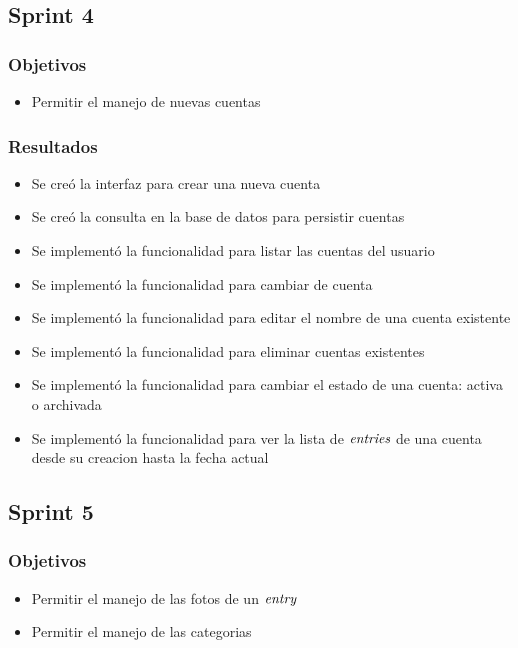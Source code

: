 \subsection{Sprint 4}
\subsubsection{Objetivos}
\begin{itemize}
\item Permitir el manejo de nuevas cuentas
\end{itemize}

\subsubsection{Resultados}
\begin{itemize}

\item Se creó la interfaz para crear una nueva cuenta
\item Se creó la consulta en la base de datos para persistir cuentas
\item Se implementó la funcionalidad para listar las cuentas del usuario 
\item Se implementó la funcionalidad para cambiar de cuenta
\item Se implementó la funcionalidad para editar el nombre de una cuenta existente
\item Se implementó la funcionalidad para eliminar cuentas existentes
\item Se implementó la funcionalidad para cambiar el estado de una cuenta: activa o archivada
\item Se implementó la funcionalidad para ver la lista de $\textit{entries}$ de una cuenta desde su creacion hasta la fecha actual

\end{itemize}


\subsection{Sprint 5}
\subsubsection{Objetivos}
\begin{itemize}
\item Permitir el manejo de las fotos de un $\textit{entry}$
\item Permitir el manejo de las categorias
\end{itemize}

